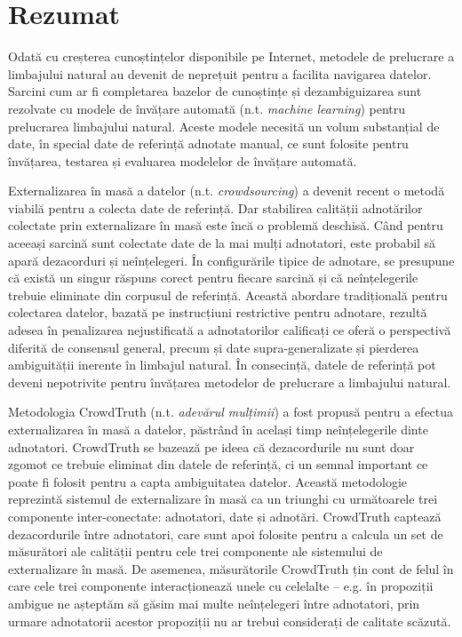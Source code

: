 \manualmark
{}

\chapter*{Rezumat}

Odată cu creșterea cunoștințelor disponibile pe Internet, metodele de prelucrare a limbajului natural au devenit de neprețuit pentru a facilita navigarea datelor. Sarcini cum ar fi completarea bazelor de cunoștințe și dezambiguizarea sunt rezolvate cu modele de învățare automată (n.t. \textit{machine learning}) pentru prelucrarea limbajului natural. Aceste modele necesită un volum substanțial de date, în special date de referință adnotate manual, ce sunt folosite pentru învățarea, testarea și evaluarea modelelor de învățare automată.

Externalizarea în masă a datelor (n.t. \textit{crowdsourcing}) a devenit recent o metodă viabilă pentru a colecta date de referință. Dar stabilirea calității adnotărilor colectate prin externalizare în masă este încă o problemă deschisă. Când pentru aceeași sarcină sunt colectate date de la mai mulți adnotatori, este probabil să apară dezacorduri și neînțelegeri. În configurările tipice de adnotare, se presupune că există un singur răspuns corect pentru fiecare sarcină și că neînțelegerile trebuie eliminate din corpusul de referință. Această abordare tradițională pentru colectarea datelor, bazată pe instrucțiuni restrictive pentru adnotare, rezultă adesea în penalizarea nejustificată a adnotatorilor calificați ce oferă o perspectivă diferită de consensul general, precum și date supra-generalizate și pierderea ambiguității inerente în limbajul natural. În consecință, datele de referință pot deveni nepotrivite pentru învățarea metodelor de prelucrare a limbajului natural.

Metodologia CrowdTruth (n.t. \textit{adevărul mulțimii}) a fost propusă pentru a efectua externalizarea în masă a datelor, păstrând în același timp neînțelegerile dinte adnotatori. CrowdTruth se bazează pe ideea că dezacordurile nu sunt doar zgomot ce trebuie eliminat din datele de referință, ci un semnal important ce poate fi folosit pentru a capta ambiguitatea datelor. Această metodologie reprezintă sistemul de externalizare în masă ca un triunghi cu următoarele trei componente inter-conectate: adnotatori, date și adnotări. CrowdTruth captează dezacordurile între adnotatori, care sunt apoi folosite pentru a calcula un set de măsurători ale calității pentru cele trei componente ale sistemului de externalizare în masă. De asemenea, măsurătorile CrowdTruth țin cont de felul în care cele trei componente interacționează unele cu celelalte -- e.g. în propoziții ambigue ne așteptăm să găsim mai multe neînțelegeri între adnotatori, prin urmare adnotatorii acestor propoziții nu ar trebui considerați de calitate scăzută.

